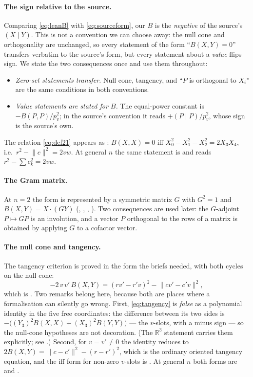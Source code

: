 \documentclass[11pt]{article}
\theoremstyle{definition}
\theoremstyle{remark}
\newcommand{\RR}{\mathbb{R}}
\begin{document}
\paragraph{The sign relative to the source.} Comparing \eqref{eq:leanB} with \eqref{eq:sourceform},
our $B$ is the \emph{negative} of the source's $(X\mid Y)$. This is not a convention we can choose
away: the null cone and orthogonality are unchanged, so every statement of the form ``$B(X,Y)=0$''
transfers verbatim to the source's form, but every statement about a \emph{value} flips sign. We
state the two consequences once and use them throughout:
\begin{itemize}
\item \emph{Zero-set statements transfer.} Null cone, tangency, and ``$P$ is orthogonal to $X_i$''
are the same conditions in both conventions.
\item \emph{Value statements are stated for $B$.} The equal-power constant is
$-B(P,P)/p_v^2$; in the source's convention it reads $+(P\mid P)/p_v^2$, whose sign is the source's
own.
\end{itemize}
The relation \eqref{eq:def21} appears as : $B(X,X)=0$ iff
$X_0^2-X_1^2-X_2^2=2X_3X_4$, i.e.\ $r^2-\lVert c\rVert^2=2vw$. At general $n$ the same statement is
 and reads $r^2-\sum c_k^2=2vw$.

\paragraph{The Gram matrix.} At $n=2$ the form is represented by a symmetric matrix $G$ with
$G^2=1$ and $B(X,Y)=X\cdot(GY)$ (, ,
, ). Two consequences are used later: the
$G$-adjoint $P\mapsto GP$ is an involution, and a vector $P$ orthogonal to the rows of a matrix is
obtained by applying $G$ to a cofactor vector.

\paragraph{The null cone and tangency.} The tangency criterion is proved in the form the briefs
needed, with both cycles on the null cone:
\begin{equation}\label{eq:tangency}
-2\,v\,v'\,B(X,Y)=(rv'-r'v)^2-\lVert cv'-c'v\rVert^2 ,
\end{equation}
which is . Two remarks belong here, because both are places where a
formalisation can silently go wrong. First, \eqref{eq:tangency} is \emph{false} as a polynomial
identity in the five free coordinates: the difference between its two sides is
$-\bigl((Y_3)^2B(X,X)+(X_3)^2B(Y,Y)\bigr)$ --- the $v$-slots, with a minus sign --- so the
null-cone hypotheses are not decoration. (The $\RR^3$
statement carries them explicitly; see .) Second, for
$v=v'\neq0$ the identity reduces to $2B(X,Y)=\lVert c-c'\rVert^2-(r-r')^2$, which is the ordinary
oriented tangency equation, and the iff form for non-zero $v$-slots is
. At general $n$ both forms are
 and .
\end{document}
